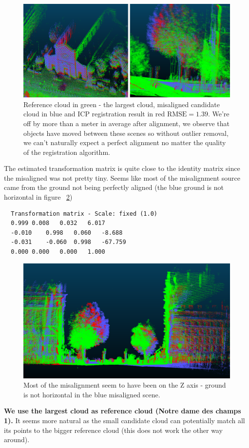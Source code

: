 \documentclass[a4paper]{article}
\begin{document}
\pagebreak

\begin{figure}[ht]
    \centering
    \includegraphics[width=0.8\linewidth]{figures/notre_dame_des_champs_registration.png}
    \caption{Reference cloud in green - the largest cloud, misaligned candidate cloud in blue and ICP registration result in red $\text{RMSE}=1.39$. We're off by more than a meter in average after alignment,
    we observe that objects have moved between these scenes so without outlier removal, we can't naturally expect a perfect alignment no matter the quality of the registration algorithm.}
    \label{fig:CC_notredame}
\end{figure}

The estimated transformation matrix is quite close to the identity matrix since the misaligned was not pretty tiny. Seems like most of the misalignment source came from the ground not being perfectly aligned (the blue ground is not horizontal in figure ~\ref{fig:CC_notredame_z})
\begin{verbatim}
  Transformation matrix - Scale: fixed (1.0)
  0.999	0.008	0.032	6.017
  -0.010	0.998	0.060	-8.688
  -0.031	-0.060	0.998	-67.759
  0.000	0.000	0.000	1.000
\end{verbatim}

\begin{figure}[ht]
    \centering
    \includegraphics[width=0.8\linewidth]{figures/notre_dame_des_champs_registration_rotation.png}
    \caption{Most of the misalignment seem to have been on the Z axis - ground is not horizontal in the blue misaligned scene.}
    \label{fig:CC_notredame_z}
\end{figure}
\textbf{We use the largest cloud as reference cloud (Notre dame des champs 1).} It seems more natural as the small candidate cloud can potentially match all its points to the bigger reference cloud (this does not work the other way around).
\end{document}
